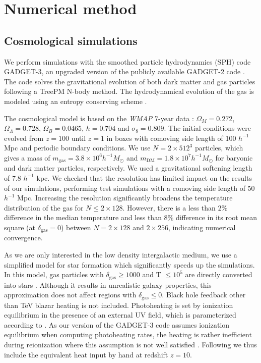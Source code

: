 \documentclass[numberedappendix]{emulateapj}
\begin{document}
\section{Numerical method}
\subsection{Cosmological simulations}
We perform simulations with the smoothed particle hydrodynamics (SPH) code \textsc{GADGET-3}, an upgraded version of the publicly available \textsc{GADGET-2} code \citep{2005MNRAS.364.1105S}. The code solves the gravitational evolution of both dark matter and gas particles following a TreePM N-body method. The hydrodynamical evolution of the gas is modeled using an entropy conserving scheme \citep{2002MNRAS.333..649S}.

The cosmological model is based on the \textit{WMAP} 7-year data \citep{2011ApJS..192...18K}: $\Omega_M=0.272$, $\Omega_{\Lambda}=0.728$, $\Omega_{B}= 0.0465$, $h=0.704$ and $\sigma_8=0.809$. The initial conditions were evolved from $z=100$ until $z=1$ in boxes with comoving side length of 100 $h^{-1}$ Mpc and periodic boundary conditions. We use $N= 2\times 512^3$ particles, which gives a mass of $m_\mathrm{gas}=3.8\times10^{6} h^{-1} M_{\odot}$ and $m_\mathrm{DM}=1.8\times 10^{7} h^{-1} M_{\odot}$ for baryonic and dark matter particles, respectively. We used a gravitational softening length of 7.8 $h^{-1}$ kpc. We checked that the resolution has limited impact on the results of our simulations, performing test simulations with a comoving side length of 50 $h^{-1}$ Mpc. Increasing the resolution significantly broadens the temperature distribution of the gas for $N\leqslant 2\times 128$. However, there is a less than $2\%$ difference in the median temperature and less than $8\%$ difference in its root mean square (at $\delta_{\mathrm{gas}}=0$) between $N=2\times 128$ and $2\times 256$, indicating numerical convergence.

As we are only interested in the low density intergalactic medium, we use a simplified model for star formation which significantly speeds up the simulations. In this model, gas particles with $\delta_{\mathrm{gas}}\geq 1000$ and T $\leq 10^5$ are directly converted into stars \citep{2004MNRAS.354..684V}. Although it results in unrealistic galaxy properties, this approximation does not affect regions with $\delta_{\mathrm{gas}} \leq 0$. Black hole feedback other than TeV blazar heating is not included. Photoheating is set by ionization equilibrium in the presence of an external UV field, which is parameterized according to \citet{2009ApJ...703.1416F}. As our version of the \textsc{GADGET-3} code assumes ionization equilibrium when computing photoheating rates, the heating is rather inefficient during reionization where this assumption is not well satisfied \citep[see e.g.][]{2014arXiv1410.1531P}. Following \citet{2012MNRAS.423..149P} we thus include the equivalent heat input by hand at redshift $z=10$.
\end{document}
